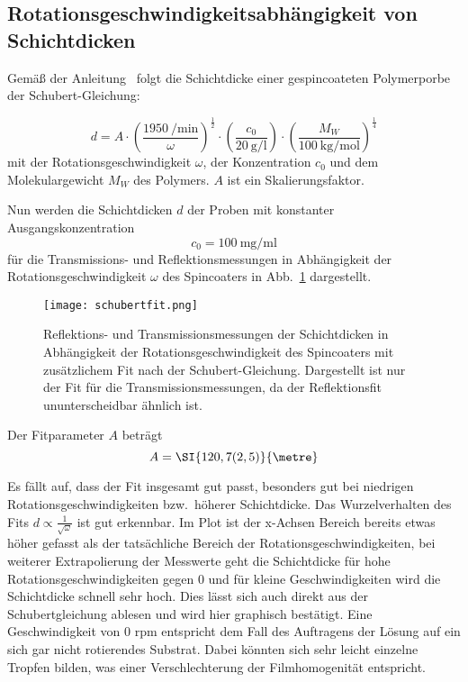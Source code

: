 \subsection{Rotationsgeschwindigkeitsabhängigkeit von Schichtdicken\label{sec:rotgeschw}}
Gemäß der Anleitung~\cite{Anleitung} folgt die Schichtdicke einer gespincoateten Polymerporbe der Schubert-Gleichung:

\begin{equation}\label{eq:schubert}
    d = A \cdot \left(\frac{\SI{1950}{\per\minute}}{\omega}\right)^\frac{1}{2} \cdot \left(\frac{c_0}{\SI{20}{\gram\per\litre}}\right) \cdot \left(\frac{M_W}{\SI{100}{\kilo\gram\per\mol}}\right)^\frac{1}{4}
\end{equation}
mit der Rotationsgeschwindigkeit $\omega$, der Konzentration $c_0$ und dem Molekulargewicht $M_W$ des Polymers. $A$ ist ein Skalierungsfaktor.

Nun werden die Schichtdicken $d$ der Proben mit konstanter Ausgangskonzentration 
\begin{equation*}
    c_0 = \SI{100}{\milli\gram\per\milli\litre}
\end{equation*} 
für die Transmissions- und Reflektionsmessungen in Abhängigkeit der Rotationsgeschwindigkeit $\omega$ des Spincoaters in Abb.~\ref{fig:schubertfit} dargestellt.

\begin{figure}[h!]
    \centering
    \texttt{[image: schubertfit.png]}
    \caption{Reflektions- und Transmissionsmessungen der Schichtdicken in Abhängigkeit der Rotationsgeschwindigkeit des Spincoaters mit zusätzlichem Fit nach der Schubert-Gleichung. Dargestellt ist nur der Fit für die Transmissionsmessungen, da der Reflektionsfit ununterscheidbar ähnlich ist.}
    \label{fig:schubertfit}
\end{figure}

Der Fitparameter $A$ beträgt
\begin{equation*}
    A = \SI{120,7(2,5)}{\metre}
\end{equation*}

Es fällt auf, dass der Fit insgesamt gut passt, besonders gut bei niedrigen Rotationsgeschwindigkeiten bzw.~höherer Schichtdicke. Das Wurzelverhalten des Fits $d \propto \frac{1}{\sqrt{\omega}}$ ist gut erkennbar. Im Plot ist der x-Achsen Bereich bereits etwas höher gefasst als der tatsächliche Bereich der Rotationsgeschwindigkeiten, bei weiterer Extrapolierung der Messwerte geht die Schichtdicke für hohe Rotationsgeschwindigkeiten gegen 0 und für kleine Geschwindigkeiten wird die Schichtdicke schnell sehr hoch. Dies lässt sich auch direkt aus der Schubertgleichung ablesen und wird hier graphisch bestätigt. Eine Geschwindigkeit von 0 rpm entspricht dem Fall des Auftragens der Lösung auf ein sich gar nicht rotierendes Substrat. Dabei könnten sich sehr leicht einzelne Tropfen bilden, was einer Verschlechterung der Filmhomogenität entspricht. 